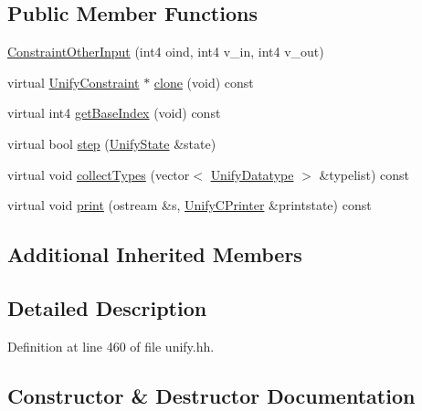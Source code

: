 \subsection*{Public Member Functions}
\begin{DoxyCompactItemize}
\item 
\mbox{\hyperlink{class_constraint_other_input_aa44c934b83c2b1b42da742034cd6d88e}{Constraint\+Other\+Input}} (int4 oind, int4 v\+\_\+in, int4 v\+\_\+out)
\item 
virtual \mbox{\hyperlink{class_unify_constraint}{Unify\+Constraint}} $\ast$ \mbox{\hyperlink{class_constraint_other_input_ab28910fd3c39f0badcb49a91685a732e}{clone}} (void) const
\item 
virtual int4 \mbox{\hyperlink{class_constraint_other_input_a5422f90baba836b389b0ba491c163e06}{get\+Base\+Index}} (void) const
\item 
virtual bool \mbox{\hyperlink{class_constraint_other_input_af89c902f186ba083e4fd4b54efcc551a}{step}} (\mbox{\hyperlink{class_unify_state}{Unify\+State}} \&state)
\item 
virtual void \mbox{\hyperlink{class_constraint_other_input_a0f02821a01359841c79cfada303770f4}{collect\+Types}} (vector$<$ \mbox{\hyperlink{class_unify_datatype}{Unify\+Datatype}} $>$ \&typelist) const
\item 
virtual void \mbox{\hyperlink{class_constraint_other_input_abe192ddbd5969e1f9abadb6ab2a1a8bf}{print}} (ostream \&s, \mbox{\hyperlink{class_unify_c_printer}{Unify\+C\+Printer}} \&printstate) const
\end{DoxyCompactItemize}
\subsection*{Additional Inherited Members}


\subsection{Detailed Description}


Definition at line 460 of file unify.\+hh.



\subsection{Constructor \& Destructor Documentation}
\mbox{\label{class_constraint_other_input_aa44c934b83c2b1b42da742034cd6d88e}} 
